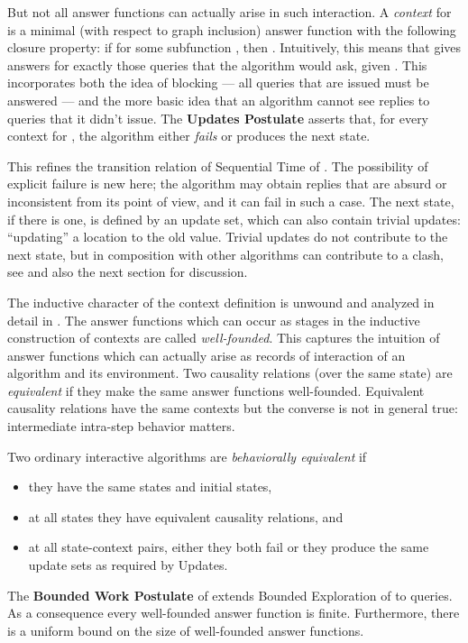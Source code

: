 \documentclass{LMCS}
\theoremstyle{definition}
\begin{document}
But not all answer functions can actually arise in such interaction.  A
\emph{context} for  is a minimal (with respect to graph
inclusion) answer function  with the following closure property:
if  for some subfunction , then
.  Intuitively, this means that  gives answers
for exactly those queries that the algorithm would ask, given .
This incorporates both the idea of blocking --- all queries that are
issued must be answered --- and the more basic idea that an algorithm
cannot see replies to queries that it didn't issue.  The \textbf{Updates
Postulate} asserts that, for every context  for , the
algorithm either \emph{fails} or produces the next state.

This refines the transition relation of Sequential Time of \cite{seqth}.
The possibility of explicit failure is new here; the algorithm may obtain
replies that are absurd or inconsistent from its point of
view, and it can fail in such a case.  The next state, if there is one, is
defined by an update set, which can also contain trivial updates:
``updating'' a location to the old value.  Trivial updates do not
contribute to the next state, but in composition with other algorithms can
contribute to a clash, see \cite{oa1} and also the next section for
discussion.

The inductive character of the context definition is unwound and analyzed
in detail in \cite{oa1}. The answer functions which can occur as stages in
the inductive construction of contexts are called
\emph{well-founded}. This captures the intuition of answer functions which
can actually arise as records of interaction of an algorithm and its
environment. Two causality relations (over the same state) are
\emph{equivalent} if they make the same answer functions well-founded.
Equivalent causality relations have the same contexts but the converse is
not in general true: intermediate intra-step behavior matters.

Two ordinary interactive algorithms are \emph{behaviorally
equivalent} if
\begin{itemize}
\item they have the same states and initial states,
\item at all states they have equivalent causality relations, and
\item at all state-context pairs, either they both fail or they produce
the same update sets as required by Updates.
\end{itemize}

The \textbf{Bounded Work Postulate} of \cite{oa1} extends Bounded
Exploration of \cite{seqth} to queries.  As a consequence every
well-founded answer function is finite.  Furthermore, there is a
uniform bound on the size of well-founded answer functions.
\end{document}
